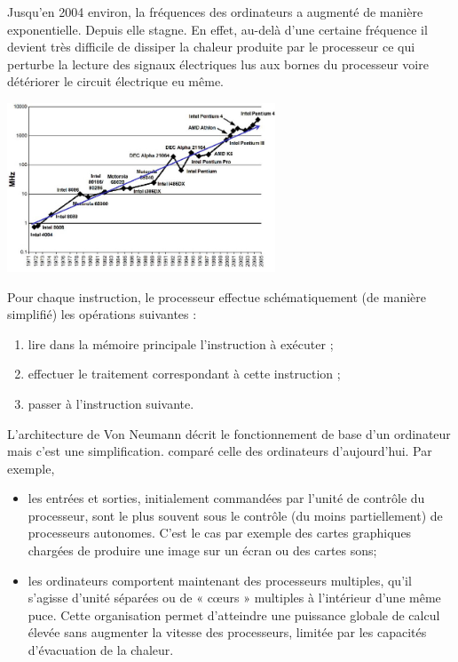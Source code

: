 \begin{eclairage}
	Jusqu'en 2004 environ, la fréquences des ordinateurs a augmenté de manière exponentielle. Depuis elle stagne. En effet, au-delà d'une certaine fréquence il devient très difficile de dissiper la chaleur produite par le processeur ce qui perturbe la lecture des signaux électriques lus aux bornes du processeur voire détériorer le circuit électrique eu même.
	\begin{center}
		\includegraphics[trim=0 0 0 0,width=0.6\textwidth]{Images/ordinateur/evolution_frequence_ordinateur.jpg}
	\end{center}
\end{eclairage}
Pour chaque instruction,  le processeur effectue schématiquement (de manière simplifié) les opérations suivantes :
\begin{enumerate}
	\item lire dans la mémoire principale l’instruction à exécuter ;
	\item effectuer le traitement correspondant à cette instruction ;
	\item passer à l’instruction suivante.
\end{enumerate}
\begin{eclairage}
	L'architecture de Von Neumann décrit le fonctionnement de base d'un ordinateur mais c'est une simplification.  comparé celle des ordinateurs d'aujourd'hui. Par exemple,
	\begin{itemize}
		\item les entrées et sorties, initialement commandées par l’unité de contrôle du processeur, sont le plus souvent sous le contrôle (du moins partiellement) de processeurs autonomes. C’est le cas par exemple des cartes graphiques chargées de produire une image sur un écran ou des cartes sons;
		\item les ordinateurs comportent maintenant des processeurs multiples, qu’il s’agisse d’unité séparées ou de
		« cœurs » multiples à l’intérieur d’une même puce. Cette organisation permet d’atteindre une puissance
		globale de calcul élevée sans augmenter la vitesse des processeurs, limitée par les capacités d’évacuation
		de la chaleur.
	\end{itemize}	
\end{eclairage}

